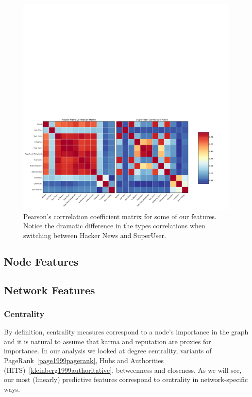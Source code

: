 \documentclass[11pt]{article}
\begin{document}
\begin{figure}[t]
\centering
\includegraphics[width=\linewidth]{correlation}
\caption{Pearson's corrrelation coefficient matrix for some of our features.
Notice the dramatic difference in the types correlations when switching
between Hacker News and SuperUser.}
\label{fig:correlation}
\end{figure}

\subsection{Node Features}

\subsection{Network Features}

\subsubsection{Centrality}
By definition, centrality measures correspond to a node's importance in the
graph and it is natural to assume that karma and reputation are proxies for
importance. In our analysis we looked at degree centrality, variants of
PageRank~\ref{page1999pagerank}, Hubs and
Authorities (HITS)~\ref{kleinberg1999authoritative}, betweenness and 
closeness. As we will see, our most (linearly) predictive features 
correspond to centrality in network-specific ways. 
\end{document}
